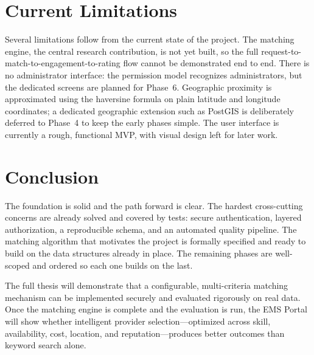 \section{Current Limitations}
Several limitations follow from the current state of the project. The matching
engine, the central research contribution, is not yet built, so the full
request-to-match-to-engagement-to-rating flow cannot be demonstrated end to end.
There is no administrator interface: the permission model recognizes
administrators, but the dedicated screens are planned for Phase~6. Geographic
proximity is approximated using the haversine formula on plain latitude and
longitude coordinates; a dedicated geographic extension such as PostGIS is
deliberately deferred to Phase~4 to keep the early phases simple. The user
interface is currently a rough, functional MVP, with visual design left for later
work.

\section{Conclusion}
The foundation is solid and the path forward is clear. The hardest
cross-cutting concerns are already solved and covered by tests: secure
authentication, layered authorization, a reproducible schema, and an automated
quality pipeline. The matching algorithm that motivates the project is formally
specified and ready to build on the data structures already in place. The
remaining phases are well-scoped and ordered so each one builds on the last.

The full thesis will demonstrate that a configurable, multi-criteria matching
mechanism can be implemented securely and evaluated rigorously on real data. Once
the matching engine is complete and the evaluation is run, the EMS Portal will
show whether intelligent provider selection—optimized across skill, availability,
cost, location, and reputation—produces better outcomes than keyword search alone.
